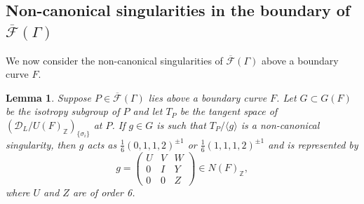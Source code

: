 \documentclass[12pt, a4paper]{article}
\newtheorem{lemma}[thm]{Lemma}
\newcommand{\ZZ}{\mathbb{Z}}
\newcommand{\la}{\langle}
\newcommand{\ra}{\rangle}
\newcommand{\dc}{\mathcal{D}}
\newcommand{\fc}{\mathcal{F}}
\begin{document}
\subsection{Non-canonical singularities in the boundary of $\overline{\fc}(\Gamma)$}
We now consider the non-canonical singularities of $\overline{\fc}(\Gamma)$ above a boundary curve $F$.
\begin{lemma}\label{bcsingclass}
  Suppose $P \in \overline{\fc}(\Gamma)$ lies above a boundary curve $F$.
  Let $G \subset G(F)$ be the isotropy subgroup of $P$ and let $T_P$ be the tangent space of $(\dc_L/U(F)_{\ZZ})_{\{\sigma_i \}}$ at $P$.
  If $g \in G$ is such that $T_P  / \la g \ra$ is a non-canonical singularity, then $g$ acts as $\frac{1}{6}(0,1,1,2)^{\pm 1}$ or $\frac{1}{6}(1,1,1,2)^{\pm 1}$ and is represented by
  \begin{equation}\label{gNFdef}
    g =
    \begin{pmatrix}
      U & V & W \\
      0 & I & Y \\
      0 & 0 & Z
    \end{pmatrix}
    \in N(F)_{\ZZ}, 
  \end{equation}
  where $U$ and $Z$ are of order 6.    
\end{lemma}
\end{document}
